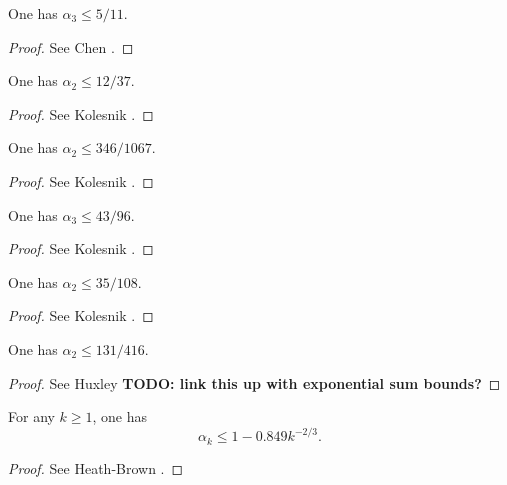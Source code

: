 \begin{lemma}\label{chen-alpha-3}
One has $\alpha_3 \le 5/11$.
\end{lemma}
\begin{proof}
See Chen \cite{chen_divisor_1965}.
\end{proof}

\begin{lemma}\label{kolesnik-alpha-2-first}
One has $\alpha_2 \le 12/37$.
\end{lemma}
\begin{proof}
See Kolesnik \cite{kolesnik_improvement_1969}.
\end{proof}

\begin{lemma}\label{kolesnik-alpha-2-second}
One has $\alpha_2 \le 346/1067$.
\end{lemma}
\begin{proof}
See Kolesnik \cite{kolesnik_1973}.
\end{proof}

\begin{lemma}\label{kolesnik-alpha-3-first}
One has $\alpha_3 \le 43/96$.
\end{lemma}
\begin{proof}
See Kolesnik \cite{kolesnik}.
\end{proof}


\begin{lemma}\label{kolesnik-alpha-2-third}
One has $\alpha_2 \le 35/108$.
\end{lemma}
\begin{proof}
See Kolesnik \cite{kolesnik_order_1982}.
\end{proof}


\begin{lemma}\label{huxley-alpha}
One has $\alpha_2 \le 131/416$.
\end{lemma}
\begin{proof}
See Huxley \cite{huxley_exponential_2003}
{\bf TODO: link this up with exponential sum bounds?}
\end{proof}

\begin{lemma}\label{hb-alpha-large}
For any $k \ge 1$, one has
\[
\alpha_k \le 1 - 0.849k^{-2/3}.
\]
\end{lemma}
\begin{proof}
See Heath-Brown \cite{heathbrown_new_2017}.
\end{proof}
